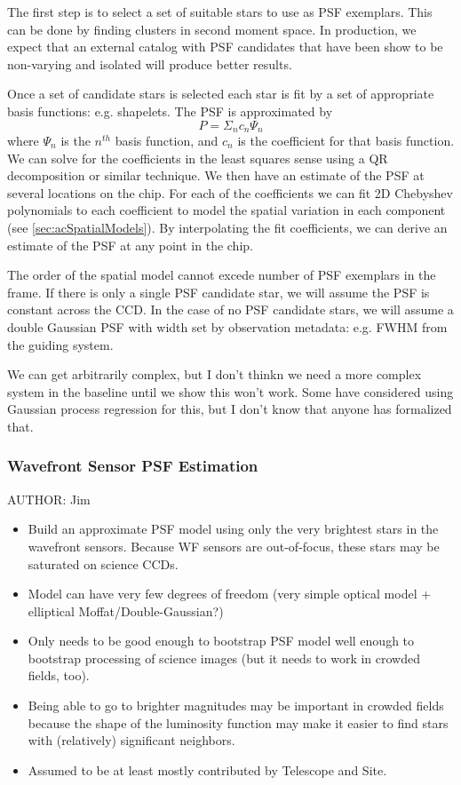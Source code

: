 The first step is to select a set of suitable stars to use as PSF exemplars.  This can be done by finding clusters in second moment space.  In production, we expect that an external catalog with PSF candidates that have been show to be non-varying and isolated will produce better results.

Once a set of candidate stars is selected each star is fit by a set of appropriate basis functions: e.g. shapelets.  The PSF is approximated by
\[
P = \Sigma_n c_n\Psi_n
\]
where $\Psi_n$ is the $n^{th}$ basis function, and $c_n$ is the coefficient for that basis function.  We can solve for the coefficients in the least squares sense using a QR decomposition or similar technique.  We then have an estimate of the PSF at several locations on the chip.  For each of the coefficients we can fit 2D Chebyshev polynomials to each coefficient to model the spatial variation in each component (see \ref{sec:acSpatialModels}).  By interpolating the fit coefficients, we can derive an estimate of the PSF at any point in the chip.

The order of the spatial model cannot excede number of PSF exemplars in the frame.  If there is only a single PSF candidate star, we will assume the PSF is constant across the CCD.  In the case of no PSF candidate stars, we will assume a double Gaussian PSF with width set by observation metadata: e.g. FWHM from the guiding system.

\begin{note}
We can get arbitrarily complex, but I don't thinkn we need a more complex system in the baseline until we show this won't work.  Some have considered using Gaussian process regression for this, but I don't know that anyone has formalized that.
\end{note}

\subsubsection{Wavefront Sensor PSF Estimation}
\label{sec:acWavefrontSensorPSF}
AUTHOR: Jim
\begin{itemize}
\item Build an approximate PSF model using only the very brightest stars in the wavefront sensors.  Because WF sensors are out-of-focus, these stars may be saturated on science CCDs.
\item Model can have very few degrees of freedom (very simple optical model + elliptical Moffat/Double-Gaussian?)
\item Only needs to be good enough to bootstrap PSF model well enough to bootstrap processing of science images (but it needs to work in crowded fields, too).
\item Being able to go to brighter magnitudes may be important in crowded fields because the shape of the luminosity function may make it easier to find stars with (relatively) significant neighbors.
\item Assumed to be at least mostly contributed by Telescope and Site.
\end{itemize}

